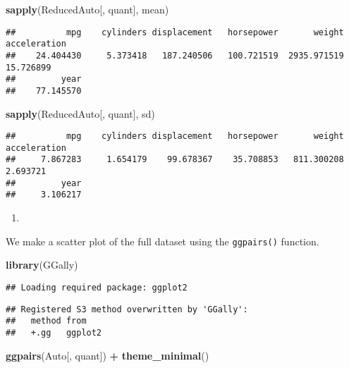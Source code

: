 \documentclass[
]{article}
\newenvironment{Shaded}{\begin{snugshade}}{\end{snugshade}}
\newcommand{\FunctionTok}[1]{\textcolor[rgb]{0.13,0.29,0.53}{\textbf{#1}}}
\newcommand{\NormalTok}[1]{#1}
\newcommand{\SpecialCharTok}[1]{\textcolor[rgb]{0.81,0.36,0.00}{\textbf{#1}}}
\providecommand{\tightlist}{%
  \setlength{\itemsep}{0pt}\setlength{\parskip}{0pt}}
\begin{document}
\begin{Shaded}
\begin{Highlighting}[]
\FunctionTok{sapply}\NormalTok{(ReducedAuto[, quant], mean)}
\end{Highlighting}
\end{Shaded}

\begin{verbatim}
##          mpg    cylinders displacement   horsepower       weight acceleration 
##    24.404430     5.373418   187.240506   100.721519  2935.971519    15.726899 
##         year 
##    77.145570
\end{verbatim}

\begin{Shaded}
\begin{Highlighting}[]
\FunctionTok{sapply}\NormalTok{(ReducedAuto[, quant], sd)}
\end{Highlighting}
\end{Shaded}

\begin{verbatim}
##          mpg    cylinders displacement   horsepower       weight acceleration 
##     7.867283     1.654179    99.678367    35.708853   811.300208     2.693721 
##         year 
##     3.106217
\end{verbatim}

\begin{enumerate}
\def\labelenumi{\alph{enumi})}
\setcounter{enumi}{4}
\tightlist
\item
\end{enumerate}

We make a scatter plot of the full dataset using the \texttt{ggpairs()}
function.

\begin{Shaded}
\begin{Highlighting}[]
\FunctionTok{library}\NormalTok{(GGally)}
\end{Highlighting}
\end{Shaded}

\begin{verbatim}
## Loading required package: ggplot2
\end{verbatim}

\begin{verbatim}
## Registered S3 method overwritten by 'GGally':
##   method from   
##   +.gg   ggplot2
\end{verbatim}

\begin{Shaded}
\begin{Highlighting}[]
\FunctionTok{ggpairs}\NormalTok{(Auto[, quant]) }\SpecialCharTok{+} \FunctionTok{theme\_minimal}\NormalTok{()}
\end{Highlighting}
\end{Shaded}
\end{document}
